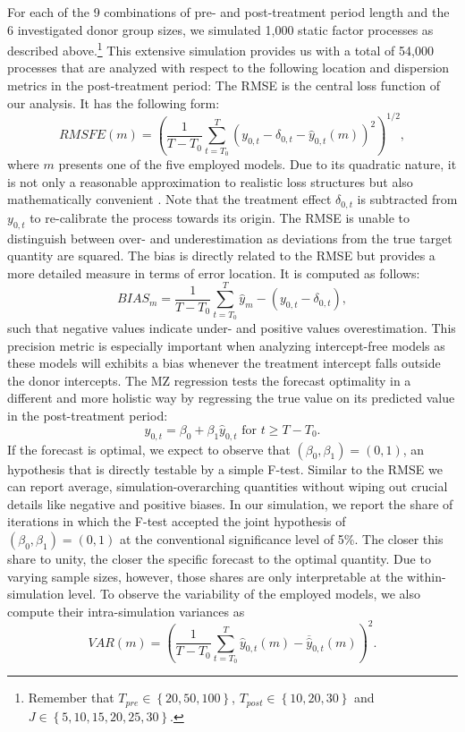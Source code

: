 For each of the 9 combinations of pre- and post-treatment period length and the 6 investigated donor group sizes, we simulated 1,000 static factor processes as described above.\footnote{Remember that $T_{pre} \in \left\lbrace 20,50,100\right\rbrace $, $T_{post} \in \left\lbrace 10,20,30\right\rbrace$ and $J \in \left\lbrace 5,10,15,20,25,30\right\rbrace$.} This extensive simulation provides us with a total of 54,000 processes that are analyzed with respect to the following location and dispersion metrics in the post-treatment period: The \ac{RMSE} is the central loss function of our analysis. It has the following form:
$$RMSFE(m) = \left(\frac{1}{T - T_0} \sum_{t = T_0}^{T} \left( y_{0,t} - \delta_{0,t} - \widehat{y}_{0,t}(m)\right) ^2 \right)^{1/2},$$
where $m$ presents one of the five employed models. Due to its quadratic nature, it is not only a reasonable approximation to realistic loss structures but also mathematically convenient \cite{diebold:2017}. Note that the treatment effect $\delta_{0,t}$ is subtracted from $y_{0,t}$ to re-calibrate the process towards its origin. The \ac{RMSE} is unable to distinguish between over- and underestimation as deviations from the true target quantity are squared. The bias is directly related to the \ac{RMSE} but provides a more detailed measure in terms of error location. It is computed as follows:
$$BIAS_m = \frac{1}{T - T_0} \sum_{t = T_0}^{T} \widehat{y}_m - (y_{0,t} - \delta_{0,t}),$$
such that negative values indicate under- and positive values overestimation. This precision metric is especially important when analyzing intercept-free models as these models will exhibits a bias whenever the treatment intercept falls outside the donor intercepts. The \ac{MZ} regression tests the forecast optimality in a different and more holistic way by regressing the true value on its predicted value in the post-treatment period: 
$$y_{0,t} = \beta_0 + \beta_1 \widehat{y}_{0,t} \text{ for } t \geq T- T_0.$$
If the forecast is optimal, we expect to observe that $(\beta_0, \beta_1) = (0,1)$, an hypothesis that is directly testable by a simple F-test. Similar to the \ac{RMSE} we can report average, simulation-overarching quantities without wiping out crucial details like negative and positive biases. In our simulation, we report the share of iterations in which the F-test accepted the joint hypothesis of $(\beta_0, \beta_1) = (0,1)$ at the conventional significance level of 5\%. The closer this share to unity, the closer the specific forecast to the optimal quantity. Due to varying sample sizes, however, those shares are only interpretable at the within-simulation level. To observe the variability of the employed models, we also compute their intra-simulation variances as
$$VAR(m) = \left(\frac{1}{T - T_0} \sum_{t = T_0}^{T} \widehat{y}_{0,t}(m) - \overline{\widehat{y}}_{0,t}(m) \right) ^2. $$


